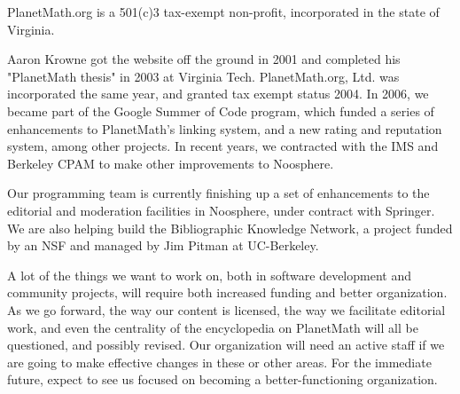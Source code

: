 
PlanetMath.org is a 501(c)3 tax-exempt non-profit, incorporated in the state of
Virginia.

Aaron Krowne got the website off the ground in 2001 and completed his
"PlanetMath thesis" in 2003 at Virginia Tech. PlanetMath.org, Ltd. was
incorporated the same year, and granted tax exempt status 2004. In 2006, we
became part of the Google Summer of Code program, which funded a series of
enhancements to PlanetMath's linking system, and a new rating and reputation
system, among other projects. In recent years, we contracted with the IMS and
Berkeley CPAM to make other improvements to Noosphere.

Our programming team is currently finishing up a set of enhancements to the
editorial and moderation facilities in Noosphere, under contract with Springer.
We are also helping build the Bibliographic Knowledge Network, a project funded
by an NSF and managed by Jim Pitman at UC-Berkeley.

A lot of the things we want to work on, both in software development and
community projects, will require both increased funding and better
organization. As we go forward, the way our content is licensed, the way we
facilitate editorial work, and even the centrality of the encyclopedia on
PlanetMath will all be questioned, and possibly revised. Our organization will
need an active staff if we are going to make effective changes in these or
other areas. For the immediate future, expect to see us focused on becoming a
better-functioning organization.
